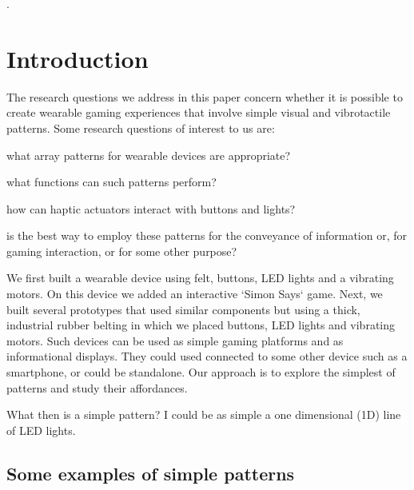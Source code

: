 \documentclass{chi-ext}
\def\plaingeneralterms{Haptics, Gaming, Wearable}
\begin{document}
. 

\terms{\plaingeneralterms}

\section{Introduction}

The research questions we address in this paper concern whether it is possible to create wearable gaming experiences that involve simple visual and vibrotactile patterns. Some  research questions of interest to us are:
\begin{inparaenum}
\item what array patterns for wearable devices are appropriate?
\item what functions can such patterns perform?
\item how can haptic actuators interact with buttons and lights?
\item is the best way to employ these patterns for the conveyance of information or, for gaming interaction, or for some other purpose?
\end{inparaenum}

We first built a wearable device using felt, buttons, LED lights and a vibrating motors. On this device we added an interactive `Simon Says` game. Next, we built several prototypes that used similar components but using a thick, industrial rubber belting in which we placed buttons, LED lights and vibrating motors. Such devices can be used as simple gaming platforms and as informational displays. They could used connected to some other device such as a smartphone, or could be standalone. Our approach is to explore the simplest of patterns and study their affordances. 

What then is a simple pattern? I could be as simple a one dimensional (1D) line of LED lights. 

\subsection{Some examples of simple patterns}
\bigskip
\end{document}
